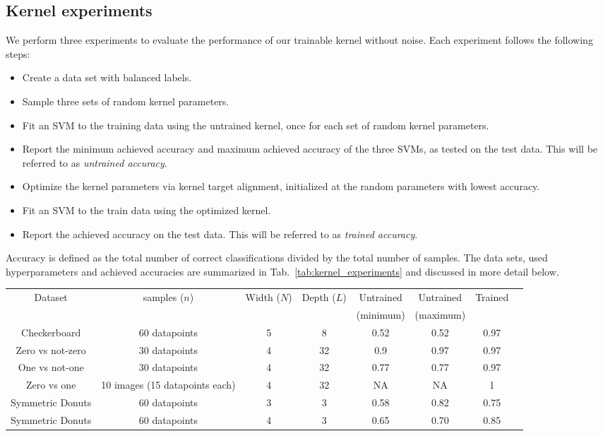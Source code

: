 \documentclass[twocolumn,superscriptaddress,nofootinbib]{revtex4-2}
\begin{document}
\subsection{Kernel experiments} \label{ssec:kernel_experiments}
%
    We perform three experiments to evaluate the performance of our trainable kernel without noise. Each experiment follows the following steps:
    \begin{itemize}
        \item Create a data set with balanced labels.
        \item Sample three sets of random kernel parameters.
        \item Fit an \ac{SVM} to the training data using the untrained kernel, once for each set of random kernel parameters.
        \item Report the minimum achieved accuracy and maximum achieved accuracy of the three \acp{SVM}, as tested on the test data. This will be referred to as \emph{untrained accuracy}.
        \item Optimize the kernel parameters via kernel target alignment, initialized at the random parameters with lowest accuracy.
        \item Fit an \ac{SVM} to the train data using the optimized kernel.
        \item Report the achieved accuracy on the test data. This will be referred to as \emph{trained accuracy}.
    \end{itemize}
    Accuracy is defined as the total number of correct classifications divided by the total number of samples. The data sets, used hyperparameters and achieved accuracies are summarized in Tab.~\ref{tab:kernel_experiments} and discussed in more detail below.
%
\begin{table*}
\caption{Kernel experiments and ensemble experiments - data sets, circuit hyperparameters and achieved accuracies} \label{tab:kernel_experiments}
\begin{tabular*}{\textwidth}{c @{\extracolsep{\fill}} ccccccc }
\toprule
 Dataset & samples ($n$) & Width ($N$) & Depth ($L$) & Untrained & Untrained & Trained \\
  & & & & (minimum) & (maximum) & \\ 
  \midrule
 Checkerboard & 60 datapoints & 5 & 8 & 0.52 & 0.52 & 0.97\\  
 Zero vs not-zero & 30 datapoints & 4 & 32 & 0.9 & 0.97 & 0.97 \\
 One vs not-one & 30 datapoints & 4 & 32 & 0.77 & 0.77 & 0.97 \\
 Zero vs one & 10 images (15 datapoints each) & 4 & 32 & NA & NA & 1\\
 Symmetric Donuts & 60 datapoints & 3 & 3 & 0.58 & 0.82 & 0.75  \\
 Symmetric Donuts & 60 datapoints & 4 & 3 & 0.65 & 0.70 & 0.85\\

 \bottomrule
\end{tabular*}
\end{table*}
%
\end{document}
